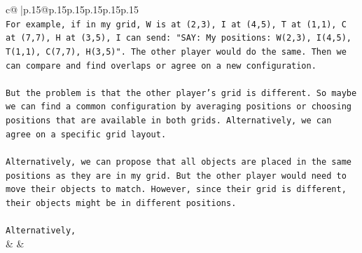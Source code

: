 \documentclass{article}
\begin{document}
{\begin{supertabular}{c@{$\;$}|p{.15\linewidth}@{}p{.15\linewidth}p{.15\linewidth}p{.15\linewidth}p{.15\linewidth}p{.15\linewidth}}
{{{\\ 
\texttt{For example, if in my grid, W is at (2,3), I at (4,5), T at (1,1), C at (7,7), H at (3,5), I can send: "SAY: My positions: W(2,3), I(4,5), T(1,1), C(7,7), H(3,5)". The other player would do the same. Then we can compare and find overlaps or agree on a new configuration. } \\
\\ 
\texttt{But the problem is that the other player's grid is different. So maybe we can find a common configuration by averaging positions or choosing positions that are available in both grids. Alternatively, we can agree on a specific grid layout. } \\
\\ 
\texttt{Alternatively, we can propose that all objects are placed in the same positions as they are in my grid. But the other player would need to move their objects to match. However, since their grid is different, their objects might be in different positions. } \\
\\ 
\texttt{Alternatively,} \\
            }
        }
    }
    & & \\ \\


\end{supertabular}}
\end{document}
